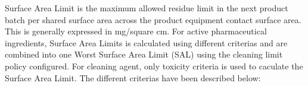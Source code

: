 Surface Area Limit is the maximum allowed residue limit in the next product batch per shared surface area across the product equipment contact surface area. This is generally expressed in mg/square cm. For active pharmaceutical ingredients, Surface Area Limits is calculated using different criterias and are combined into one Worst Surface Area Limit (SAL) using the cleaning limit policy configured. For cleaning agent, only toxicity criteria is used to caculate the Surface Area Limit. The different criterias have been described below:\relax